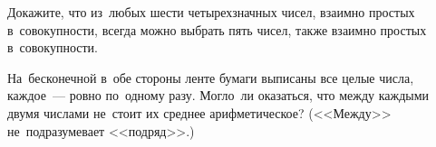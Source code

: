\begin{problems}

\item
Докажите, что из~любых шести четырехзначных чисел, взаимно простых
в~совокупности, всегда можно выбрать пять чисел, также взаимно простых
в~совокупности.

\item
На~бесконечной в~обе стороны ленте бумаги выписаны все целые числа, каждое~---
ровно по~одному разу.
Могло~ли оказаться, что между каждыми двумя числами не~стоит их среднее
арифметическое?
(<<Между>> не~подразумевает <<подряд>>.)

\iffalse %

\item
Из~двухсот чисел: $1, 2, 3, \ldots, 199, 200$ выбрали одно число, меньшее $16$,
и~еще $99$~чисел.
Докажите, что среди выбранных чисел найдутся хотя~бы 2 таких, что одно из~них
делится на~другое.

\fi %

\end{problems}


